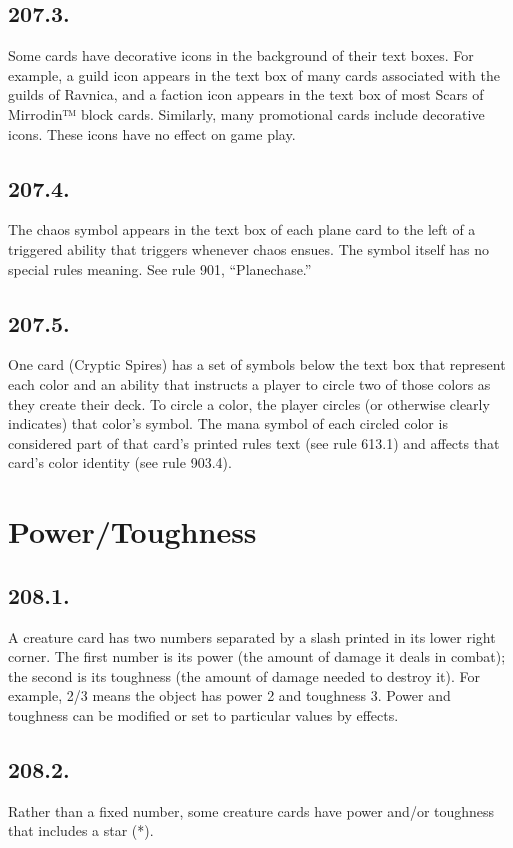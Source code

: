 \subsection*{207.3.}
Some cards have decorative icons in the background of their text boxes. For example, a guild icon appears in the text box of many cards associated with the guilds of Ravnica, and a faction icon appears in the text box of most Scars of Mirrodin™ block cards. Similarly, many promotional cards include decorative icons. These icons have no effect on game play.

\subsection*{207.4.}
The chaos symbol appears in the text box of each plane card to the left of a triggered ability that triggers whenever chaos ensues. The symbol itself has no special rules meaning. See rule 901, “Planechase.”

\subsection*{207.5.}
One card (Cryptic Spires) has a set of symbols below the text box that represent each color and an ability that instructs a player to circle two of those colors as they create their deck. To circle a color, the player circles (or otherwise clearly indicates) that color’s symbol. The mana symbol of each circled color is considered part of that card’s printed rules text (see rule 613.1) and affects that card’s color identity (see rule 903.4).

\section{Power/Toughness}
\subsection*{208.1.}
A creature card has two numbers separated by a slash printed in its lower right corner. The first number is its power (the amount of damage it deals in combat); the second is its toughness (the amount of damage needed to destroy it). For example, 2/3 means the object has power 2 and toughness 3. Power and toughness can be modified or set to particular values by effects.

\subsection*{208.2.}
Rather than a fixed number, some creature cards have power and/or toughness that includes a star (*).

